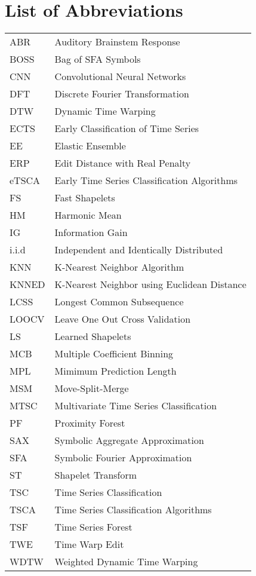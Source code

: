 \section*{List of Abbreviations}


\begin{table}[h!]
\begin{tabular}{ll}
ABR   & Auditory Brainstem Response\\
BOSS   & Bag of SFA Symbols\\
CNN   & Convolutional Neural Networks\\
DFT   & Discrete Fourier Transformation\\
DTW   & Dynamic Time Warping\\
ECTS   & Early Classification of Time Series\\
EE   & Elastic Ensemble\\
ERP   & Edit Distance with Real Penalty\\
eTSCA   & Early Time Series Classification Algorithms\\
FS   & Fast Shapelets\\
HM   & Harmonic Mean\\
IG   & Information Gain\\
i.i.d   & Independent and Identically Distributed\\
KNN   & K-Nearest Neighbor Algorithm\\
KNNED   & K-Nearest Neighbor using Euclidean Distance\\
LCSS   & Longest Common Subsequence\\
LOOCV   & Leave One Out Cross Validation\\
LS   & Learned Shapelets\\
MCB   & Multiple Coefficient Binning\\
MPL   & Mimimum Prediction Length\\
MSM   & Move-Split-Merge\\
MTSC   & Multivariate Time Series Classification\\
PF   & Proximity Forest\\
SAX   & Symbolic Aggregate Approximation\\
SFA   & Symbolic Fourier Approximation\\
ST   & Shapelet Transform\\
TSC   & Time Series Classification\\
TSCA   & Time Series Classification Algorithms\\
TSF   & Time Series Forest\\
TWE   & Time Warp Edit\\
WDTW   & Weighted Dynamic Time Warping
\end{tabular}
\end{table}

\null\newpage

